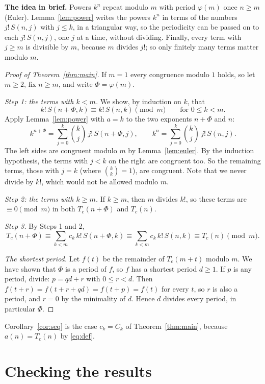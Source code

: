 \documentclass[11pt,a4paper]{article}
\theoremstyle{definition}
\theoremstyle{remark}
\newcommand{\para}[1]{\par\medskip\noindent\textbf{#1}\enspace}
\begin{document}
\para{The idea in brief.} Powers $k^n$ repeat modulo $m$ with period $\varphi(m)$ once $n\ge m$ (Euler).
Lemma~\ref{lem:power} writes the powers $k^n$ in terms of the numbers $j!\,S(n,j)$ with $j\le k$, in a triangular way, so
the periodicity can be passed on to each $j!\,S(n,j)$, one $j$ at a time, without dividing. Finally, every term with
$j\ge m$ is divisible by $m$, because $m$ divides $j!$; so only finitely many terms matter modulo $m$.

\begin{proof}[Proof of Theorem~\ref{thm:main}]
If $m=1$ every congruence modulo $1$ holds, so let $m\ge2$, fix $n\ge m$, and write $\Phi=\varphi(m)$.

\emph{Step 1: the terms with $k<m$.} We show, by induction on $k$, that
\[
k!\,S(n+\Phi,k)\equiv k!\,S(n,k)\pmod m\qquad\text{for }0\le k<m.
\]
Apply Lemma~\ref{lem:power} with $a=k$ to the two exponents $n+\Phi$ and $n$:
\[
k^{n+\Phi}=\sum_{j=0}^{k}\binom kj\,j!\,S(n+\Phi,j),\qquad
k^{n}=\sum_{j=0}^{k}\binom kj\,j!\,S(n,j).
\]
The left sides are congruent modulo $m$ by Lemma~\ref{lem:euler}. By the induction hypothesis, the terms with $j<k$ on the
right are congruent too. So the remaining terms, those with $j=k$ (where $\binom kk=1$), are congruent. Note that we never
divide by $k!$, which would not be allowed modulo $m$.

\emph{Step 2: the terms with $k\ge m$.} If $k\ge m$, then $m$ divides $k!$, so these terms are $\equiv0\pmod m$ in both
$T_c(n+\Phi)$ and $T_c(n)$.

\emph{Step 3.} By Steps 1 and 2,
\[
T_c(n+\Phi)\equiv\sum_{k<m}c_k\,k!\,S(n+\Phi,k)\equiv\sum_{k<m}c_k\,k!\,S(n,k)\equiv T_c(n)\pmod m .
\]

\emph{The shortest period.} Let $f(t)$ be the remainder of $T_c(m+t)$ modulo $m$. We have shown that $\Phi$ is a period of
$f$, so $f$ has a shortest period $d\ge1$. If $p$ is any period, divide: $p=qd+r$ with $0\le r<d$. Then
$f(t+r)=f(t+r+qd)=f(t+p)=f(t)$ for every $t$, so $r$ is also a period, and $r=0$ by the minimality of $d$. Hence $d$
divides every period, in particular $\Phi$.
\end{proof}

Corollary~\ref{cor:seq} is the case $c_k=C_k$ of Theorem~\ref{thm:main}, because $a(n)=T_c(n)$ by \eqref{eq:def}.

\section{Checking the results}\label{sec:checks}
\end{document}
